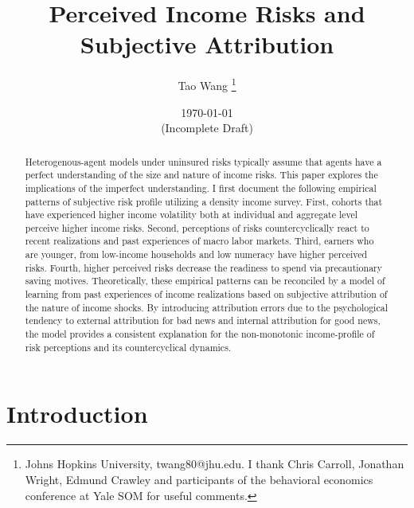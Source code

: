 \documentclass[12pt,notitlepage,onecolumn,aps,pra]{article}
\begin{document}
    
    \title{Perceived Income Risks and Subjective Attribution}\author{Tao Wang \thanks{Johns Hopkins University, twang80@jhu.edu. I thank Chris Carroll, Jonathan Wright, Edmund Crawley and participants of the behavioral economics conference at Yale SOM for useful comments.}}

\date{\today \\(Incomplete Draft)}
\maketitle\begin{abstract}Heterogenous-agent models under uninsured risks typically assume that agents have a perfect understanding of the size and nature of income risks. This paper explores the implications of the imperfect understanding. I first document the following empirical patterns of subjective risk profile utilizing a density income survey. First, cohorts that have experienced higher income volatility both at individual and aggregate level perceive higher income risks. Second, perceptions of risks countercyclically react to recent realizations and past experiences of macro labor markets. Third, earners who are younger,  from low-income households and low numeracy have higher perceived risks. Fourth,  higher perceived risks decrease the readiness to spend via precautionary saving motives. Theoretically, these empirical patterns can be reconciled by a model of learning from past experiences of income realizations based on subjective attribution of the nature of income shocks. By introducing attribution errors due to the psychological tendency to external attribution for bad news and internal attribution for good news, the model provides a consistent explanation for the non-monotonic income-profile of risk perceptions and its countercyclical dynamics.\end{abstract}


    
    

    
    \hypertarget{introduction}{%
\section{Introduction}\label{introduction}}
\end{document}

